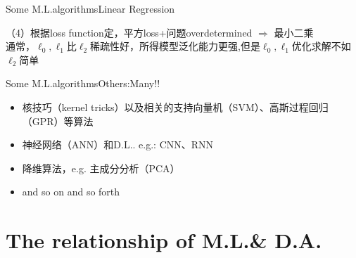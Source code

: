 \documentclass{beamer}
\begin{document}
\begin{frame}{Some M.L.algorithms}{\quad \quad \quad Linear Regression}

 （4）根据loss function定，平方loss+问题overdetermined $\Rightarrow$ 最小二乘\\
  通常，$\ell_0,\ell_1$比$\ell_2$稀疏性好，所得模型泛化能力更强,但是$\ell_0,\ell_1$优化求解不如$\ell_2$简单

\end{frame}

\begin{frame}{Some M.L.algorithms}{\quad \quad \quad Others:Many!!}
\begin{itemize}
\item 核技巧（kernel tricks）以及相关的支持向量机（SVM）、高斯过程回归（GPR）等算法
\item 神经网络（ANN）和D.L.. e.g.: CNN、RNN
\item 降维算法，e.g. 主成分分析（PCA）
\item and so on and so forth
\end{itemize}

\end{frame}


\section{The relationship of M.L.\& D.A.}
\end{document}
